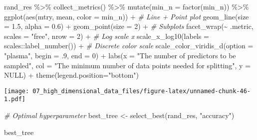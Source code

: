 \documentclass[
]{book}
\newenvironment{Shaded}{\begin{snugshade}}{\end{snugshade}}
\newcommand{\AttributeTok}[1]{\textcolor[rgb]{0.77,0.63,0.00}{#1}}
\newcommand{\CommentTok}[1]{\textcolor[rgb]{0.56,0.35,0.01}{\textit{#1}}}
\newcommand{\ConstantTok}[1]{\textcolor[rgb]{0.00,0.00,0.00}{#1}}
\newcommand{\DecValTok}[1]{\textcolor[rgb]{0.00,0.00,0.81}{#1}}
\newcommand{\FloatTok}[1]{\textcolor[rgb]{0.00,0.00,0.81}{#1}}
\newcommand{\FunctionTok}[1]{\textcolor[rgb]{0.00,0.00,0.00}{#1}}
\newcommand{\NormalTok}[1]{#1}
\newcommand{\OtherTok}[1]{\textcolor[rgb]{0.56,0.35,0.01}{#1}}
\newcommand{\SpecialCharTok}[1]{\textcolor[rgb]{0.00,0.00,0.00}{#1}}
\newcommand{\StringTok}[1]{\textcolor[rgb]{0.31,0.60,0.02}{#1}}
\begin{document}
\begin{Shaded}
\begin{Highlighting}[]
\NormalTok{rand\_res }\SpecialCharTok{\%\textgreater{}\%}
  \FunctionTok{collect\_metrics}\NormalTok{() }\SpecialCharTok{\%\textgreater{}\%}
  \FunctionTok{mutate}\NormalTok{(}\AttributeTok{min\_n =} \FunctionTok{factor}\NormalTok{(min\_n)) }\SpecialCharTok{\%\textgreater{}\%}
  \FunctionTok{ggplot}\NormalTok{(}\FunctionTok{aes}\NormalTok{(mtry, mean, }\AttributeTok{color =}\NormalTok{ min\_n)) }\SpecialCharTok{+}
  \CommentTok{\# Line + Point plot }
  \FunctionTok{geom\_line}\NormalTok{(}\AttributeTok{size =} \FloatTok{1.5}\NormalTok{, }\AttributeTok{alpha =} \FloatTok{0.6}\NormalTok{) }\SpecialCharTok{+}
  \FunctionTok{geom\_point}\NormalTok{(}\AttributeTok{size =} \DecValTok{2}\NormalTok{) }\SpecialCharTok{+}
  \CommentTok{\# Subplots }
  \FunctionTok{facet\_wrap}\NormalTok{(}\SpecialCharTok{\textasciitilde{}}\NormalTok{ .metric, }
             \AttributeTok{scales =} \StringTok{"free"}\NormalTok{, }
             \AttributeTok{nrow =} \DecValTok{2}\NormalTok{) }\SpecialCharTok{+}
  \CommentTok{\# Log scale x }
  \FunctionTok{scale\_x\_log10}\NormalTok{(}\AttributeTok{labels =}\NormalTok{ scales}\SpecialCharTok{::}\FunctionTok{label\_number}\NormalTok{()) }\SpecialCharTok{+}
  \CommentTok{\# Discrete color scale }
  \FunctionTok{scale\_color\_viridis\_d}\NormalTok{(}\AttributeTok{option =} \StringTok{"plasma"}\NormalTok{, }\AttributeTok{begin =}\NormalTok{ .}\DecValTok{9}\NormalTok{, }\AttributeTok{end =} \DecValTok{0}\NormalTok{) }\SpecialCharTok{+}
  \FunctionTok{labs}\NormalTok{(}\AttributeTok{x =} \StringTok{"The number of predictors to be sampled"}\NormalTok{,}
       \AttributeTok{col =} \StringTok{"The minimum number of data points needed for splitting"}\NormalTok{,}
       \AttributeTok{y =} \ConstantTok{NULL}\NormalTok{) }\SpecialCharTok{+}
  \FunctionTok{theme}\NormalTok{(}\AttributeTok{legend.position=}\StringTok{"bottom"}\NormalTok{)}
\end{Highlighting}
\end{Shaded}

\texttt{[image: 07\_high\_dimensional\_data\_files/figure-latex/unnamed-chunk-46-1.pdf]}

\begin{Shaded}
\begin{Highlighting}[]
\CommentTok{\# Optimal hyperparameter}
\NormalTok{best\_tree }\OtherTok{\textless{}{-}} \FunctionTok{select\_best}\NormalTok{(rand\_res, }\StringTok{"accuracy"}\NormalTok{)}

\NormalTok{best\_tree}
\end{Highlighting}
\end{Shaded}
\end{document}
